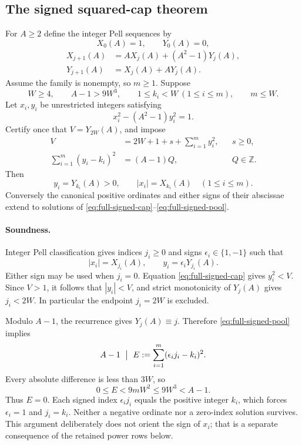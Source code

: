 \subsection{The signed squared-cap theorem}
For $A\geq2$ define the integer Pell sequences by
\[
 X_0(A)=1,\qquad Y_0(A)=0,
\]
\[
 \begin{aligned}
 X_{j+1}(A)&=A X_j(A)+(A^2-1)Y_j(A),\\
 Y_{j+1}(A)&=X_j(A)+A Y_j(A).
 \end{aligned}
\]
Assume the family is nonempty, so $m\geq1$. Suppose
\[
 W\geq4,\qquad A-1>9W^3,\qquad
 1\leq k_i<W\ (1\leq i\leq m),\qquad m\leq W.
\]
Let $x_i,y_i$ be unrestricted integers satisfying
\[
 x_i^2-(A^2-1)y_i^2=1.
\]
Certify once that $V=Y_{2W}(A)$, and impose
\begin{align}
 V&=2W+1+s+\sum_{i=1}^m y_i^2,
       &&s\geq0, \label{eq:full-signed-cap}\\
 \sum_{i=1}^m(y_i-k_i)^2&=(A-1)Q,
       &&Q\in\mathbb Z. \label{eq:full-signed-pool}
\end{align}
Then
\[
 y_i=Y_{k_i}(A)>0,\qquad |x_i|=X_{k_i}(A)
 \quad(1\leq i\leq m).
\]
Conversely the canonical positive ordinates and either signs of their
abscissae extend to solutions of
\eqref{eq:full-signed-cap}--\eqref{eq:full-signed-pool}.

\paragraph{Soundness.}
Integer Pell classification gives indices $j_i\geq0$ and signs
$\epsilon_i\in\{1,-1\}$ such that
\[
 |x_i|=X_{j_i}(A),\qquad y_i=\epsilon_iY_{j_i}(A).
\]
Either sign may be used when $j_i=0$. Equation
\eqref{eq:full-signed-cap} gives $y_i^2<V$. Since $V>1$, it follows
that $|y_i|<V$, and strict monotonicity of $Y_j(A)$ gives
$j_i<2W$. In particular the endpoint $j_i=2W$ is excluded.

Modulo $A-1$, the recurrence gives $Y_j(A)\equiv j$. Therefore
\eqref{eq:full-signed-pool} implies
\[
 A-1\ \bigm|\ E:=\sum_{i=1}^m(\epsilon_i j_i-k_i)^2.
\]
Every absolute difference is less than $3W$, so
\[
 0\leq E<9mW^2\leq9W^3<A-1.
\]
Thus $E=0$. Each signed index $\epsilon_i j_i$ equals the positive
integer $k_i$, which forces $\epsilon_i=1$ and $j_i=k_i$.
Neither a negative ordinate nor a zero-index solution survives. This
argument deliberately does not orient the sign of $x_i$; that is a
separate consequence of the retained power rows below.

